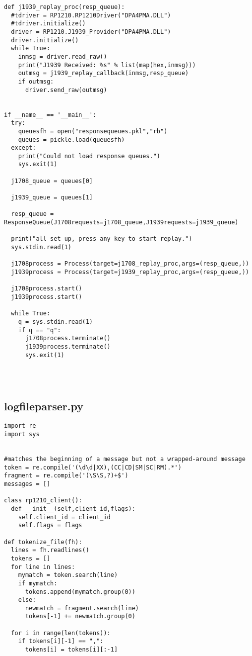 \begin{appendices}
\begin{verbatim}
def j1939_replay_proc(resp_queue):
  #tdriver = RP1210.RP1210Driver("DPA4PMA.DLL")
  #tdriver.initialize()
  driver = RP1210.J1939_Provider("DPA4PMA.DLL")
  driver.initialize()
  while True:
    inmsg = driver.read_raw()
    print("J1939 Received: %s" % list(map(hex,inmsg)))
    outmsg = j1939_replay_callback(inmsg,resp_queue)
    if outmsg:
      driver.send_raw(outmsg)


if __name__ == '__main__':
  try:
    queuesfh = open("responsequeues.pkl","rb")
    queues = pickle.load(queuesfh)
  except:
    print("Could not load response queues.")
    sys.exit(1)

  j1708_queue = queues[0]
  
  j1939_queue = queues[1]

  resp_queue = ResponseQueue(J1708requests=j1708_queue,J1939requests=j1939_queue)

  print("all set up, press any key to start replay.")
  sys.stdin.read(1)

  j1708process = Process(target=j1708_replay_proc,args=(resp_queue,))
  j1939process = Process(target=j1939_replay_proc,args=(resp_queue,))

  j1708process.start()
  j1939process.start()

  while True:
    q = sys.stdin.read(1)
    if q == "q":
      j1708process.terminate()
      j1939process.terminate()
      sys.exit(1)




\end{verbatim}

\subsection{logfileparser.py}
\begin{verbatim}
import re
import sys


#matches the beginning of a message but not a wrapped-around message
token = re.compile('(\d\d|XX),(CC|CD|SM|SC|RM).*')
fragment = re.compile('(\S\S,?)+$')
messages = []

class rp1210_client():
  def __init__(self,client_id,flags):
    self.client_id = client_id
    self.flags = flags

def tokenize_file(fh):
  lines = fh.readlines()
  tokens = []
  for line in lines:
    mymatch = token.search(line)
    if mymatch:
      tokens.append(mymatch.group(0))
    else:
      newmatch = fragment.search(line)
      tokens[-1] += newmatch.group(0)
  
  for i in range(len(tokens)):
    if tokens[i][-1] == ",":
      tokens[i] = tokens[i][:-1]
      

\end{verbatim}
\end{appendices}
